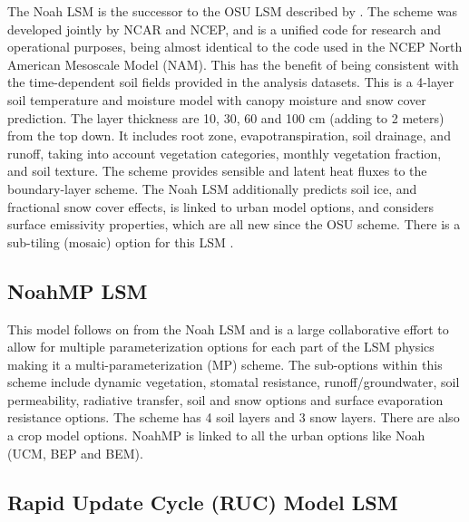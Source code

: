 The Noah LSM is the successor to the OSU LSM described by \citet{chendudhia01}. 
The scheme was developed jointly by NCAR and NCEP, and is a unified
code for research and operational purposes, being almost identical
to the code used in the NCEP North American Mesoscale Model (NAM). This has the benefit of 
being consistent with the time-dependent soil fields provided in the analysis datasets.
This is a 4-layer soil temperature and moisture model with canopy 
moisture and snow cover prediction. The layer thickness are 10, 30, 60 and 100 cm
(adding to 2 meters) from the top down. It includes root zone, evapotranspiration,
soil drainage, and runoff, taking into account vegetation categories,
monthly vegetation fraction, and soil texture. The scheme provides sensible and latent 
heat fluxes to the boundary-layer scheme. The Noah LSM additionally predicts 
soil ice, and fractional snow cover effects, is linked to urban model options,
and considers surface emissivity properties, which are all new since the OSU
scheme. There is a sub-tiling (mosaic) option for this LSM \citep{li13}.

\subsection{NoahMP LSM}

This model follows on from the Noah LSM and is a large collaborative effort \citep{niu11, yang11} to allow for multiple parameterization options
for each part of the LSM physics making it a multi-parameterization (MP) scheme. The sub-options within this scheme
include dynamic vegetation, stomatal resistance, runoff/groundwater, soil permeability, radiative transfer, soil and snow
options and surface evaporation resistance options. The scheme has 4 soil layers and 3 snow layers.
There are also a crop model options. NoahMP is linked to all the urban options like Noah (UCM, BEP and BEM).

\subsection{Rapid Update Cycle (RUC) Model LSM}

